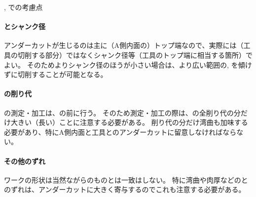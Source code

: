 \begin{\Columnname}{\BfaceDimpleMilling, \DfaceDimpleMilling での考慮点}
\paragraph*{\indexTDTSlotCutter\nameToolDiameter とシャンク径}
アンダーカットが生じるのは主に（A側内面の）トップ端なので、実際には\indexTDTSlotCutter\nameToolDiameter（工具の切削する部分）ではなくシャンク径等（工具のトップ端に相当する箇所）でよい。
そのため\ToolDiameter よりシャンク径のほうが小さい場合は、より広い範囲の\BfaceDimpleMilling, \DfaceDimpleMilling を傾けずに切削することが可能となる。
\tcbline*
\paragraph*{\nameEndFacecut の削り代}
\Dimple の測定・加工は、\TopEndFacecutMilling の前に行う。
そのため測定・加工の際は、\nameEndFacecut の全削り代の分だけ大きい（長い）ことに注意する必要がある。
削り代の分だけ湾曲も加味する必要があり、特にA側内面と工具とのアンダーカットに留意しなければならない。
\tcbline*
\paragraph*{その他のずれ}
ワークの形状は当然ながら\nameDrawing のものとは一致はしない。
特に湾曲や肉厚などの\Drawing とのずれは、アンダーカットに大きく寄与するのでこれも注意する必要がある。
\end{\Columnname}




